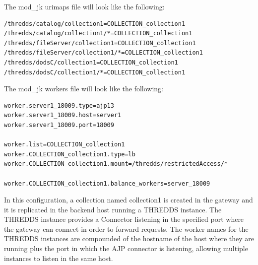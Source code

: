 \documentclass[a4paper,12pt]{article}
\begin{document}
The mod\_jk urimaps file will look like the following:

\begin{lstlisting}
/thredds/catalog/collection1=COLLECTION_collection1
/thredds/catalog/collection1/*=COLLECTION_collection1
/thredds/fileServer/collection1=COLLECTION_collection1
/thredds/fileServer/collection1/*=COLLECTION_collection1
/thredds/dodsC/collection1=COLLECTION_collection1
/thredds/dodsC/collection1/*=COLLECTION_collection1
\end{lstlisting}

The mod\_jk workers file will look like the following:

\begin{lstlisting}
worker.server1_18009.type=ajp13
worker.server1_18009.host=server1
worker.server1_18009.port=18009

worker.list=COLLECTION_collection1
worker.COLLECTION_collection1.type=lb
worker.COLLECTION_collection1.mount=/thredds/restrictedAccess/*

worker.COLLECTION_collection1.balance_workers=server_18009
\end{lstlisting}

In this configuration, a collection named collection1 is created in the gateway and it is replicated in the backend host running a THREDDS instance. The THREDDS instance provides a Connector listening in the specified port where the gateway can connect in order to forward requests. The worker names for the THREDDS instances are compounded of the hostname of the host where they are running plus the port in which the AJP connector is listening, allowing multiple instances to listen in the same host.
\end{document}
